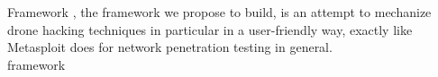 \begin{chaptercover}{Framework}%
{
{\large \hyphenation{} , the framework we propose to build, is an attempt to mechanize drone hacking techniques in particular in a user-friendly way, exactly like Metasploit does for network penetration testing in general. \newline\\}}%
{framework}


\end{chaptercover}
